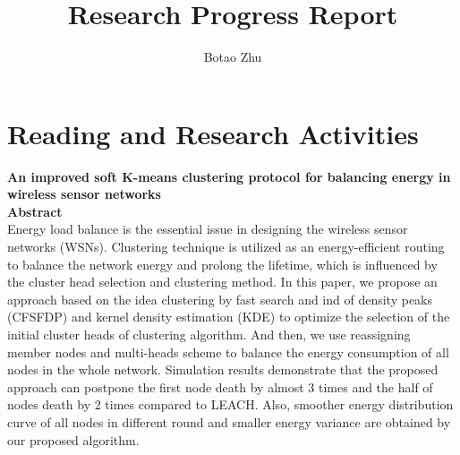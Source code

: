 \documentclass[11pt]{report}
\title{Research Progress Report}
\author{Botao Zhu}
\begin{document}
	
	\maketitle
	 \chead{} 
	 \cfoot{} 
	\renewcommand{\footrulewidth}{1.0pt}
	\renewcommand{\headrulewidth}{2.0pt}
	\renewcommand{\arraystretch}{1.3}
	\pagestyle{fancy}
	
	\renewcommand{\thesection}{\arabic{section}}
	
	\section{Reading and Research Activities}
 
	


	\textbf{An improved soft K-means clustering protocol for balancing energy in wireless sensor networks}\\
	
    \noindent \textbf{Abstract} \\
    Energy load balance is the essential issue in designing the wireless sensor networks (WSNs). Clustering technique is utilized as an energy-efficient routing to balance the network energy and prolong the lifetime, which is influenced by the cluster head selection and clustering method. In this paper, we propose an approach based on the idea clustering by fast search and ind of density peaks (CFSFDP) and kernel density estimation (KDE) to optimize the selection of the initial cluster heads of clustering algorithm. And then, we use reassigning member nodes and multi-heads scheme to balance the energy consumption of all nodes in the whole network. Simulation results demonstrate that the proposed approach can postpone the first node death by almost 3 times and the half of nodes death by 2 times compared to LEACH. Also, smoother energy distribution curve of all nodes in different round and smaller energy variance are obtained by our proposed algorithm.
	
\end{document}
